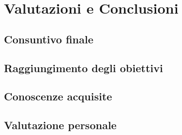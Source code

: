 \chapter{Valutazioni e Conclusioni}
\label{cap:conclusioni}

\section{Consuntivo finale}

\section{Raggiungimento degli obiettivi}

\section{Conoscenze acquisite}

\section{Valutazione personale}
